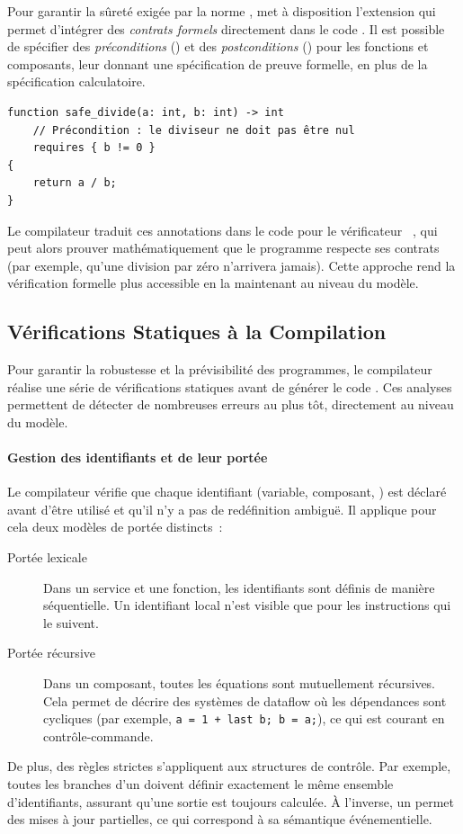 Pour garantir la sûreté exigée par la norme \iso, \GRust met à disposition l'extension \GReusot qui
permet d'intégrer des \emph{contrats formels} directement dans le code \GRSync.
Il est possible de spécifier des \emph{préconditions} () et des \emph{postconditions}
() pour les fonctions et composants, leur donnant une spécification de preuve formelle,
en plus de la spécification calculatoire.

\begin{lstlisting}[language=GRust]
function safe_divide(a: int, b: int) -> int
    // Précondition : le diviseur ne doit pas être nul
    requires { b != 0 }
{
    return a / b;
}
\end{lstlisting}
Le compilateur traduit ces annotations dans le code \Rust pour le vérificateur
\Creusot~\cite{DBLP:conf/icfem/DenisJM22}, qui peut alors prouver mathématiquement que le programme
respecte ses contrats (par exemple, qu'une division par zéro n'arrivera jamais). Cette approche rend
la vérification formelle plus accessible en la maintenant au niveau du modèle.

\subsection{Vérifications Statiques à la Compilation}

Pour garantir la robustesse et la prévisibilité des programmes, le compilateur \GRust réalise une
série de vérifications statiques avant de générer le code \Rust. Ces analyses permettent de détecter
de nombreuses erreurs au plus tôt, directement au niveau du modèle.

\paragraph{Gestion des identifiants et de leur portée} Le compilateur vérifie que chaque identifiant
(variable, composant, \etc) est déclaré avant d'être utilisé et qu'il n'y a pas de redéfinition
ambiguë. Il applique pour cela deux modèles de portée distincts~:
\begin{description}
      \item[Portée lexicale] Dans un service et une fonction, les identifiants sont définis de
            manière séquentielle. Un identifiant local n'est visible que pour les instructions qui
            le suivent.
      \item[Portée récursive] Dans un composant, toutes les équations sont mutuellement récursives.
            Cela permet de décrire des systèmes de dataflow où les dépendances
            sont cycliques (par exemple, \texttt{a = 1 + last b; b = a;}), ce qui est courant en
            contrôle-commande.
\end{description}
De plus, des règles strictes s'appliquent aux structures de contrôle. Par exemple, toutes les
branches d'un  doivent définir exactement le même ensemble d'identifiants, assurant
qu'une sortie est toujours calculée. À l'inverse, un  permet des mises à jour
partielles, ce qui correspond à sa sémantique événementielle.

